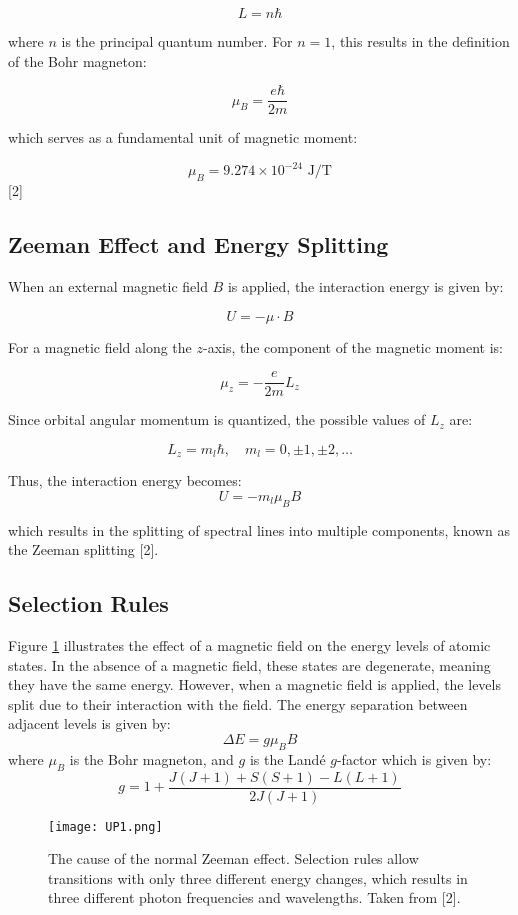 \documentclass[11pt,twocolumn, a4paper]{article}
\numberwithin{equation}{section} %
\numberwithin{figure}{section} %
\numberwithin{table}{section} %
\begin{document}
\[L = n\hbar\]

where $n$ is the principal quantum number. For $n = 1$, this results in the definition of the Bohr magneton:

\[\mu_B = \frac{e\hbar}{2m}\]

which serves as a fundamental unit of magnetic moment:

\begin{equation}
\mu_B = 9.274 \times 10^{-24} \text{ J/T}
\end{equation}
[2]

\subsection{Zeeman Effect and Energy Splitting}

When an external magnetic field $B$ is applied, the interaction energy is given by:

\[U = -\mu \cdot B\]

For a magnetic field along the $z$-axis, the component of the magnetic moment is:

\[\mu_z = - \frac{e}{2m} L_z\]

Since orbital angular momentum is quantized, the possible values of $L_z$ are:

\[L_z = m_l \hbar, \quad m_l = 0, \pm1, \pm2, \dots\]

Thus, the interaction energy becomes:
\[U = - m_l \mu_B B\]

which results in the splitting of spectral lines into multiple components, known as the Zeeman splitting [2].


\subsection{Selection Rules}
Figure \ref{fig:UP1} illustrates the effect of a magnetic field on the energy levels of atomic states. In the absence of a magnetic field, these states are degenerate, meaning they have the same energy. However, when a magnetic field is applied, the levels split due to their interaction with the field. The energy separation between adjacent levels is given by:
\[
\Delta E = g \mu_B B
\]
where \( \mu_B \) is the Bohr magneton, and \( g \) is the Landé \( g \)-factor which is given by:
\begin{equation}
    g = 1+ \frac{J(J+1)+S(S+1)-L(L+1)}{2J(J+1)}
\end{equation}

\begin{figure}[H]
    \centering
    \texttt{[image: UP1.png]}
    \caption{The cause of the normal Zeeman effect. Selection rules allow transitions with only three different energy changes, which results in three different photon frequencies and wavelengths. Taken from [2].}
    \label{fig:UP1}
\end{figure}
\end{document}
